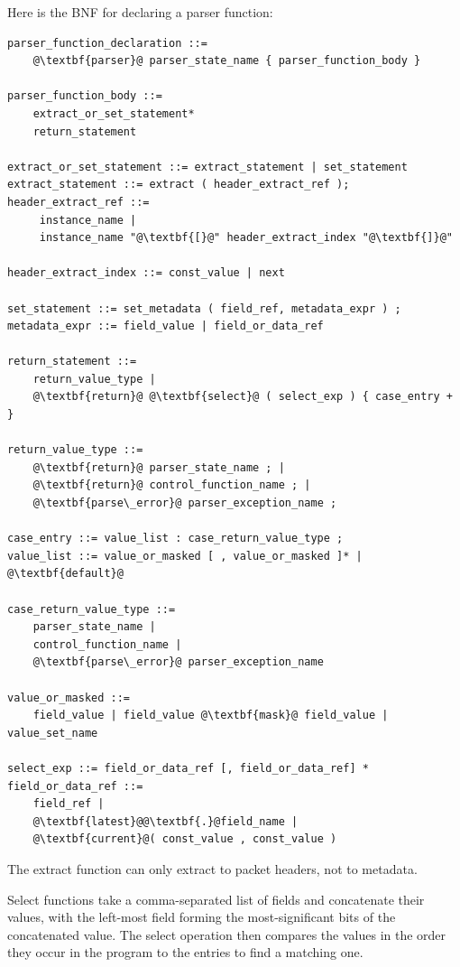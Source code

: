 \documentclass[12pt]{article}
\begin{document}

Here is the BNF for declaring a parser function:

\begin{lstlisting}[frame=single,backgroundcolor=\color{bnfgreen},escapechar=\@]
parser_function_declaration ::=
    @\textbf{parser}@ parser_state_name { parser_function_body }

parser_function_body ::=
    extract_or_set_statement*
    return_statement

extract_or_set_statement ::= extract_statement | set_statement
extract_statement ::= extract ( header_extract_ref ); 
header_extract_ref ::=
     instance_name |
     instance_name "@\textbf{[}@" header_extract_index "@\textbf{]}@"

header_extract_index ::= const_value | next

set_statement ::= set_metadata ( field_ref, metadata_expr ) ;
metadata_expr ::= field_value | field_or_data_ref

return_statement ::=
    return_value_type |
    @\textbf{return}@ @\textbf{select}@ ( select_exp ) { case_entry + }

return_value_type ::= 
    @\textbf{return}@ parser_state_name ; | 
    @\textbf{return}@ control_function_name ; | 
    @\textbf{parse\_error}@ parser_exception_name ;

case_entry ::= value_list : case_return_value_type ;
value_list ::= value_or_masked [ , value_or_masked ]* | @\textbf{default}@

case_return_value_type ::= 
    parser_state_name | 
    control_function_name | 
    @\textbf{parse\_error}@ parser_exception_name

value_or_masked ::=
    field_value | field_value @\textbf{mask}@ field_value | value_set_name

select_exp ::= field_or_data_ref [, field_or_data_ref] * 
field_or_data_ref ::=
    field_ref |
    @\textbf{latest}@@\textbf{.}@field_name |
    @\textbf{current}@( const_value , const_value )
\end{lstlisting}

The extract function can only extract to packet headers, not to metadata.

Select functions take a comma-separated list of fields and concatenate their 
values, with the left-most field forming the most-significant bits of the 
concatenated value.  The select operation then compares the values in the 
order they occur in the program to the entries to find a matching one.
\end{document}
